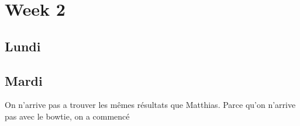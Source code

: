 \section{Week 2}

\subsection{Lundi}


\subsection{Mardi}

On n'arrive pas a trouver les mêmes résultats que Matthias. Parce qu'on n'arrive pas avec le bowtie, on a
commencé 